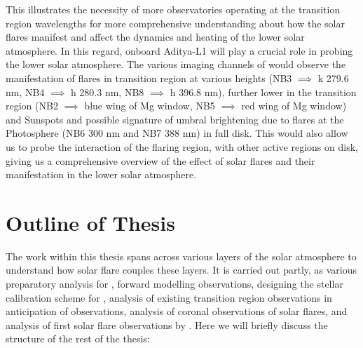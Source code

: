 This illustrates the necessity of more observatories operating at the transition region wavelengths for more comprehensive understanding about how the solar flares manifest and affect the dynamics and heating of the lower solar atmosphere. In this regard, {\suit} onboard Aditya-L1 will play a crucial role in probing the lower solar atmosphere. The various imaging channels of {\suit} would observe the manifestation of flares in transition region at various heights (NB3 $\implies$  k 279.6 nm, NB4 $\implies$  h 280.3 nm, NB8 $\implies$  h 396.8 nm), further lower in the transition region (NB2 $\implies$ blue wing of Mg window, NB5 $\implies$ red wing of Mg window) and Sunspots and possible signature of umbral brightening due to flares at the Photosphere (NB6 300 nm and NB7 388 nm) in full disk. This would also allow us to probe the interaction of the flaring region, with other active regions on disk, giving us a comprehensive overview of the effect of solar flares and their manifestation in the lower solar atmosphere.

\section{Outline of Thesis}\label{sec:outline}

The work within this thesis spans across various layers of the solar atmosphere to understand how solar flare couples these layers. It is carried out partly, as various preparatory analysis for {\suit}, forward modelling {\suit} observations, designing the stellar calibration scheme for {\suit}, analysis of existing transition region observations in anticipation of {\suit} observations, analysis of coronal observations of solar flares, and analysis of first solar flare observations by {\suit}. Here we will briefly discuss the structure of the rest of the thesis:

